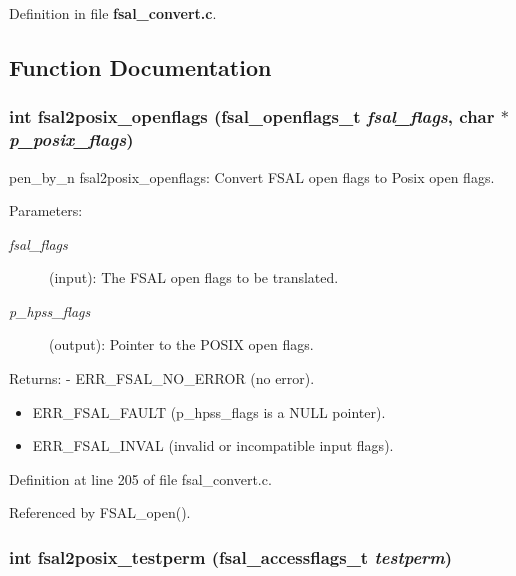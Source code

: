 Definition in file {\bf fsal\_\-convert.c}.

\subsection{Function Documentation}
\subsubsection{\setlength{\rightskip}{0pt plus 5cm}int fsal2posix\_\-openflags (fsal\_\-openflags\_\-t {\em fsal\_\-flags}, char $\ast$ {\em p\_\-posix\_\-flags})}\label{fsal__convert_8c_a4}


pen\_\-by\_\-n fsal2posix\_\-openflags: Convert FSAL open flags to Posix open flags.

\begin{Desc}
\item[Parameters:]
\begin{description}
\item[{\em fsal\_\-flags}](input): The FSAL open flags to be translated. \item[{\em p\_\-hpss\_\-flags}](output): Pointer to the POSIX open flags.\end{description}
\end{Desc}
\begin{Desc}
\item[Returns:]- ERR\_\-FSAL\_\-NO\_\-ERROR (no error).\begin{itemize}
\item ERR\_\-FSAL\_\-FAULT (p\_\-hpss\_\-flags is a NULL pointer).\item ERR\_\-FSAL\_\-INVAL (invalid or incompatible input flags). \end{itemize}
\end{Desc}


Definition at line 205 of file fsal\_\-convert.c.

Referenced by FSAL\_\-open().
\subsubsection{\setlength{\rightskip}{0pt plus 5cm}int fsal2posix\_\-testperm (fsal\_\-accessflags\_\-t {\em testperm})}\label{fsal__convert_8c_a3}


